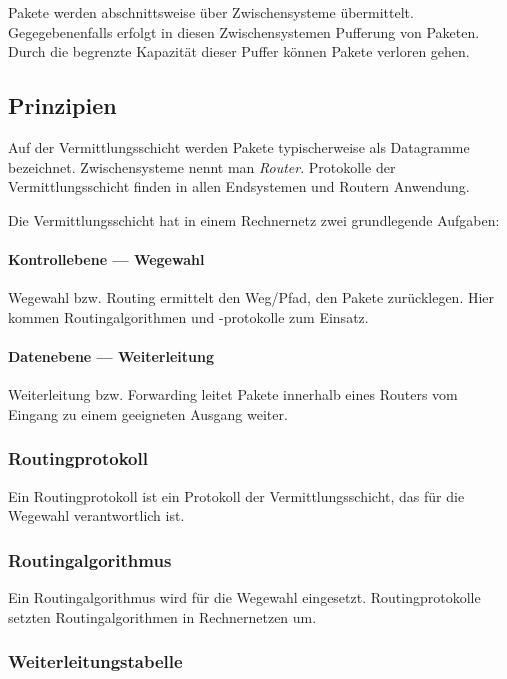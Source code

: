 \documentclass[a4paper, 14pt]{article}
\begin{document}
	Pakete werden abschnittsweise über Zwischensysteme übermittelt.
	Gegegebenenfalls erfolgt in diesen Zwischensystemen Pufferung von Paketen.
	Durch die begrenzte Kapazität dieser Puffer können Pakete verloren gehen.

	\subsection{Prinzipien}

	Auf der Vermittlungsschicht werden Pakete typischerweise als Datagramme bezeichnet.
	Zwischensysteme nennt man \emph{Router}.
	Protokolle der Vermittlungsschicht finden in allen Endsystemen und Routern Anwendung.

	Die Vermittlungsschicht hat in einem Rechnernetz zwei grundlegende Aufgaben:

	\paragraph{Kontrollebene --- Wegewahl}

	Wegewahl bzw. Routing ermittelt den Weg/Pfad, den Pakete zurücklegen.
	Hier kommen Routingalgorithmen und -protokolle zum Einsatz.

	\paragraph{Datenebene --- Weiterleitung}

	Weiterleitung bzw. Forwarding leitet Pakete innerhalb eines Routers vom Eingang zu einem geeigneten Ausgang weiter.

	\subsubsection{Routingprotokoll}

	Ein Routingprotokoll ist ein Protokoll der Vermittlungsschicht, das für die Wegewahl verantwortlich ist.

	\subsubsection{Routingalgorithmus}

	Ein Routingalgorithmus wird für die Wegewahl eingesetzt.
	Routingprotokolle setzten Routingalgorithmen in Rechnernetzen um.

	\subsubsection{Weiterleitungstabelle}
\end{document}
